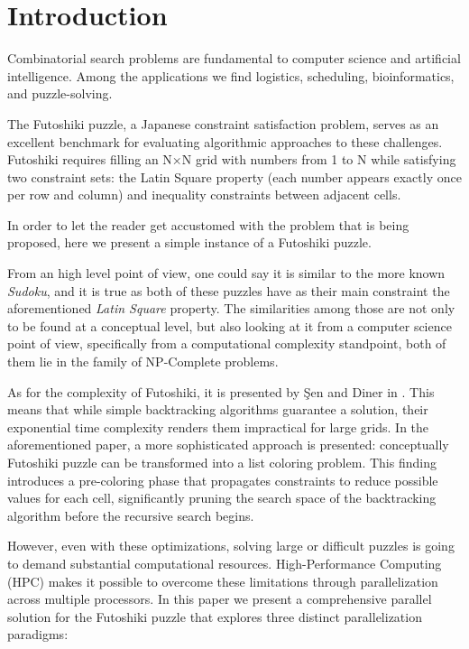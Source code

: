 \section{Introduction}
Combinatorial search problems are fundamental to computer science and artificial intelligence. Among the applications we find logistics, scheduling, bioinformatics, and puzzle-solving. 

The Futoshiki puzzle, a Japanese constraint satisfaction problem, serves as an excellent benchmark for evaluating algorithmic approaches to these challenges. Futoshiki requires filling an N×N grid with numbers from 1 to N while satisfying two constraint sets: the Latin Square property (each number appears exactly once per row and column) and inequality constraints between adjacent cells.

In order to let the reader get accustomed with the problem that is being proposed, here we present a simple instance of a Futoshiki puzzle.


From an high level point of view, one could say it is similar to the more known \textit{Sudoku}, and it is true as both of these puzzles have as their main constraint the aforementioned \textit{Latin Square} property. The similarities among those are not only to be found at a conceptual level, but also looking at it from a computer science point of view, specifically from a computational complexity standpoint, both of them lie in the family of NP-Complete problems. 

As for the complexity of Futoshiki, it is presented by Şen and Diner in \cite{Sen2024Futoshiki}. This means that while simple backtracking algorithms guarantee a solution, their exponential time complexity renders them impractical for large grids. In the aforementioned paper, a more sophisticated approach is presented: conceptually Futoshiki puzzle can be transformed into a list coloring problem. This finding introduces a pre-coloring phase that propagates constraints to reduce possible values for each cell, significantly pruning the search space of the backtracking algorithm before the recursive search begins.

However, even with these optimizations, solving large or difficult puzzles is going to demand substantial computational resources. High-Performance Computing (HPC) makes it possible to overcome these limitations through parallelization across multiple processors. In this paper we present a comprehensive parallel solution for the Futoshiki puzzle that explores three distinct parallelization paradigms:

